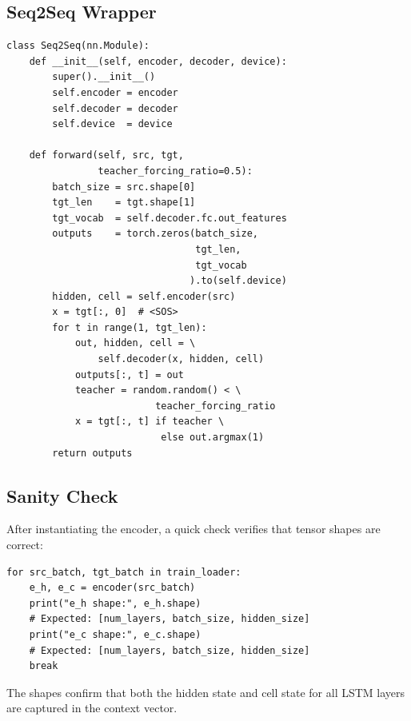 \documentclass[12pt,a4paper]{article}
\begin{document}
\subsection{Seq2Seq Wrapper}

\begin{tcolorbox}[colback=gray!5!white,colframe=gray!60!black,title=\texttt{Seq2Seq} (PyTorch)]
\begin{verbatim}
class Seq2Seq(nn.Module):
    def __init__(self, encoder, decoder, device):
        super().__init__()
        self.encoder = encoder
        self.decoder = decoder
        self.device  = device

    def forward(self, src, tgt,
                teacher_forcing_ratio=0.5):
        batch_size = src.shape[0]
        tgt_len    = tgt.shape[1]
        tgt_vocab  = self.decoder.fc.out_features
        outputs    = torch.zeros(batch_size,
                                 tgt_len,
                                 tgt_vocab
                                ).to(self.device)
        hidden, cell = self.encoder(src)
        x = tgt[:, 0]  # <SOS>
        for t in range(1, tgt_len):
            out, hidden, cell = \
                self.decoder(x, hidden, cell)
            outputs[:, t] = out
            teacher = random.random() < \
                          teacher_forcing_ratio
            x = tgt[:, t] if teacher \
                           else out.argmax(1)
        return outputs
\end{verbatim}
\end{tcolorbox}

\subsection{Sanity Check}

After instantiating the encoder, a quick check verifies that tensor shapes are correct:

\begin{tcolorbox}[colback=gray!5!white,colframe=gray!60!black,title=Shape Sanity Check]
\begin{verbatim}
for src_batch, tgt_batch in train_loader:
    e_h, e_c = encoder(src_batch)
    print("e_h shape:", e_h.shape)
    # Expected: [num_layers, batch_size, hidden_size]
    print("e_c shape:", e_c.shape)
    # Expected: [num_layers, batch_size, hidden_size]
    break
\end{verbatim}
\end{tcolorbox}

The shapes confirm that both the hidden state and cell state for all LSTM layers are captured in
the context vector.
\end{document}
